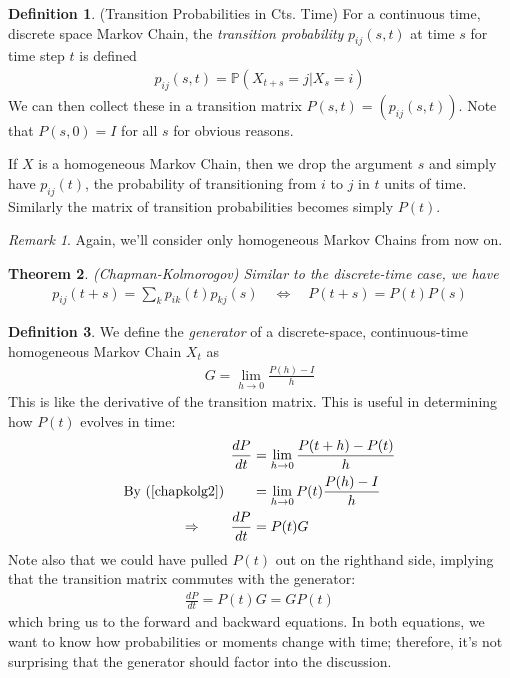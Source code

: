 \documentclass[12pt]{article}
\theoremstyle{plain}
\newtheorem{thm}{Theorem}[section]
\theoremstyle{definition}
\newtheorem{defn}[thm]{Definition}
\theoremstyle{remark}
\newtheorem*{rmk}{Remark}
\begin{document}
\begin{defn}{(Transition Probabilities in Cts. Time)}
For a continuous time, discrete space Markov Chain, the \emph{transition
probability} $p_{ij}(s,t)$ at time $s$ for time step $t$ is defined
\begin{align*}
  p_{ij}(s,t) = \mathbb{P}(X_{t+s}=j|X_s=i)
\end{align*}
We can then collect these in a transition matrix $P(s,t) =
(p_{ij}(s,t))$. Note that $P(s,0) = I$ for all $s$ for obvious reasons.

If $X$ is a homogeneous Markov Chain, then we drop the argument $s$ and
simply have $p_{ij}(t)$, the probability of transitioning from $i$ to
$j$ in $t$ units of time. Similarly the matrix of transition
probabilities becomes simply $P(t)$.
\end{defn}

\begin{rmk}
Again, we'll consider only homogeneous Markov Chains from now on.
\end{rmk}

\begin{thm}{\emph{(Chapman-Kolmorogov)}}
Similar to the discrete-time case, we have
\begin{align}
  p_{ij}(t+s) = \sum_k p_{ik}(t) p_{kj}(s)
  \quad \Leftrightarrow \quad
  P(t+s) = P(t)P(s)
  \label{chapkolg2}
\end{align}
\end{thm}

\begin{defn}
We define the \emph{generator} of a discrete-space, continuous-time
homogeneous Markov Chain $X_t$ as
\begin{align*}
  G = \lim_{h\rightarrow0} \frac{P(h)-I}{h}
\end{align*}
This is like the derivative of the transition matrix. This is useful in
determining how $P(t)$ evolves in time:
\begin{align*}
  \frac{dP}{dt}
  &= \lim_{h\rightarrow0} \frac{P(t+h)-P(t)}{h}\\
  \text{By~(\ref{chapkolg2})}\qquad
  &= \lim_{h\rightarrow0} P(t) \frac{P(h)-I}{h}\\
  \Rightarrow\qquad
  \frac{dP}{dt}
  &= P(t) G
\end{align*}
Note also that we could have pulled $P(t)$ out on the righthand side,
implying that the transition matrix commutes with the generator:
\begin{align*}
  \frac{dP}{dt}
  = P(t) G
  = GP(t)
\end{align*}
which bring us to the forward and backward equations. In both equations,
we want to know how probabilities or moments change with time;
therefore, it's not surprising that the generator should factor into the
discussion.
\end{defn}
\end{document}
